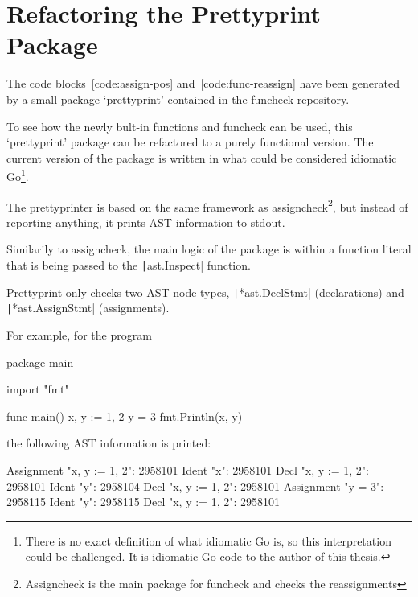 
\section{Refactoring the Prettyprint Package}


The code blocks~\ref{code:assign-pos} and~\ref{code:func-reassign} have been
generated by a small package `prettyprint' contained in the funcheck repository.

To see how the newly bult-in functions and funcheck can be used, this `prettyprint' package
can be refactored to a purely functional version.
The current version of the package is written in what could be considered idiomatic
Go\footnote{
	There is no exact definition of what idiomatic Go is, so this interpretation
	could be challenged. It is idiomatic Go code to the author of this thesis.
}. %


The prettyprinter is based on the same framework as assigncheck\footnote{Assigncheck
is the main package for funcheck and checks the reassignments}, but instead
of reporting anything, it prints AST information to \gls{stdout}.

Similarily to assigncheck, the main logic of the package is within a
function literal that is being passed to the \texttt|ast.Inspect|
function.

Prettyprint only checks two AST node types, \texttt|*ast.DeclStmt|
(declarations) and \texttt|*ast.AssignStmt| (assignments).

For example, for the program
\begin{gocode}
package main

import "fmt"

func main() {
	x, y := 1, 2
	y = 3
	fmt.Println(x, y)
}
\end{gocode}
the following AST information is printed:

\begin{gocode}
Assignment "x, y := 1, 2": 2958101
		Ident "x": 2958101
				Decl "x, y := 1, 2": 2958101
		Ident "y": 2958104
				Decl "x, y := 1, 2": 2958101
Assignment "y = 3": 2958115
		Ident "y": 2958115
				Decl "x, y := 1, 2": 2958101
\end{gocode}

